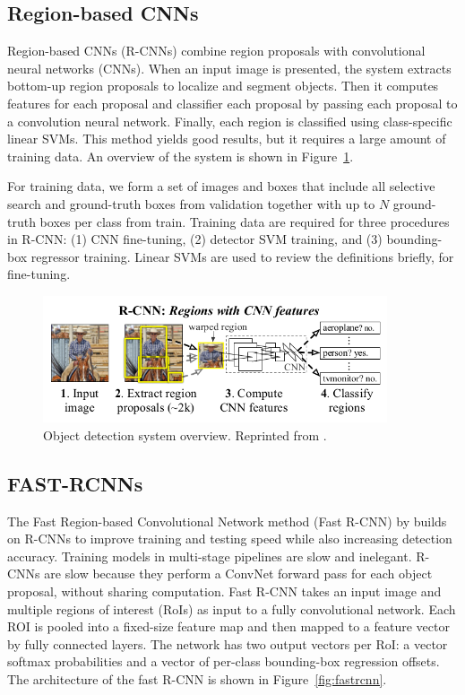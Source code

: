 \subsection{Region-based CNNs}
Region-based CNNs (R-CNNs) \cite{girshick2014rich} combine region proposals with convolutional neural networks (CNNs). When an input image is presented, the system extracts bottom-up region proposals to localize and segment objects. Then it computes features for each proposal and classifier each proposal by passing each proposal to a convolution neural network. Finally, each region is classified using class-specific linear SVMs. This method yields good results, but it requires a large amount of training data. An overview of the system is shown in Figure~\ref{fig:rcnn}.

For training data, we form a set of images and boxes that include all selective search and ground-truth boxes from validation together with up to $N$ ground-truth boxes per class from train. Training data are required for three procedures in R-CNN: (1) CNN fine-tuning, (2) detector SVM training, and (3) bounding-box regressor training. Linear SVMs are used to review the definitions briefly, for fine-tuning. 

\begin{figure}[t]
  \centering
  \includegraphics[width=4in]{figures/rcnn.jpg}  
  \caption[R-CNNs]{Object detection system overview. Reprinted from . }
  \label{fig:rcnn}
\end{figure}

\subsection{FAST-RCNNs}
The Fast Region-based Convolutional Network method (Fast R-CNN) by  builds on R-CNNs to improve training and testing speed while also increasing detection accuracy. Training models in multi-stage pipelines are slow and inelegant. R-CNNs are slow because they perform a ConvNet forward pass for each object proposal, without sharing computation. Fast R-CNN takes an input image and multiple regions of interest (RoIs) as input to a fully convolutional network. Each ROI is pooled into a fixed-size feature map and then mapped to a feature vector by fully connected layers. The network has two output vectors per RoI: a vector softmax probabilities and a vector of per-class bounding-box regression offsets. The architecture of the fast R-CNN is shown in Figure~\ref{fig:fastrcnn}. 


